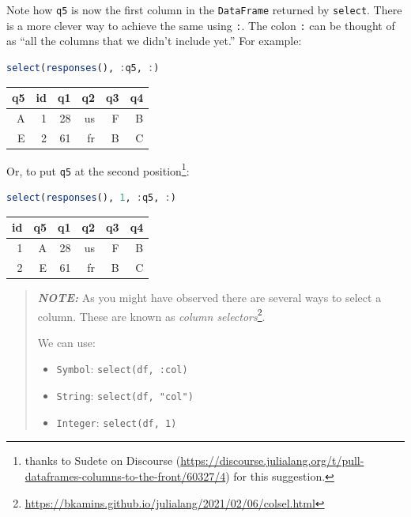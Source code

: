 \documentclass[
  notoc %
]{tufte-book}
\DeclareRobustCommand{\href}[2]{#2\footnote{\url{#1}}}
\newcommand{\passthrough}[1]{#1}
\begin{document}
Note how \passthrough{\lstinline!q5!} is now the first column in the
\passthrough{\lstinline!DataFrame!} returned by
\passthrough{\lstinline!select!}. There is a more clever way to achieve
the same using \passthrough{\lstinline!:!}. The colon
\passthrough{\lstinline!:!} can be thought of as ``all the columns that
we didn't include yet.'' For example:

\begin{lstlisting}[language=Julia]
select(responses(), :q5, :)
\end{lstlisting}

\begin{longtable}[]{@{}rrrrrr@{}}
\toprule
q5 & id & q1 & q2 & q3 & q4 \\
\midrule
\endhead
A & 1 & 28 & us & F & B \\
E & 2 & 61 & fr & B & C \\
\bottomrule
\end{longtable}

Or, to put \passthrough{\lstinline!q5!} at the second
position\footnote{thanks to Sudete on Discourse
  (\url{https://discourse.julialang.org/t/pull-dataframes-columns-to-the-front/60327/4})
  for this suggestion.}:

\begin{lstlisting}[language=Julia]
select(responses(), 1, :q5, :)
\end{lstlisting}

\begin{longtable}[]{@{}rrrrrr@{}}
\toprule
id & q5 & q1 & q2 & q3 & q4 \\
\midrule
\endhead
1 & A & 28 & us & F & B \\
2 & E & 61 & fr & B & C \\
\bottomrule
\end{longtable}

\begin{quote}
\textbf{\emph{NOTE:}} As you might have observed there are several ways
to select a column. These are known as
\href{https://bkamins.github.io/julialang/2021/02/06/colsel.html}{\emph{column
selectors}}.

We can use:

\begin{itemize}
\item
  \passthrough{\lstinline!Symbol!}:
  \passthrough{\lstinline!select(df, :col)!}
\item
  \passthrough{\lstinline!String!}:
  \passthrough{\lstinline!select(df, "col")!}
\item
  \passthrough{\lstinline!Integer!}:
  \passthrough{\lstinline!select(df, 1)!}
\end{itemize}
\end{quote}
\end{document}
